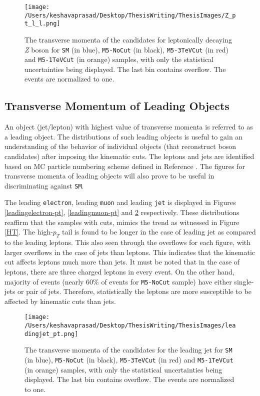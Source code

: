 \begin{figure}[!htb]
	\centering
	\texttt{[image: /Users/keshavaprasad/Desktop/ThesisWriting/ThesisImages/Z\_pt\_l\_l.png]}
	\caption{The transverse momenta of the candidates for leptonically decaying \textit{Z} boson for \texttt{SM} (in blue), \texttt{M5-NoCut} (in black), \texttt{M5-3TeVCut} (in red) and \texttt{M5-1TeVCut} (in orange) samples, with only the statistical uncertainties being displayed. The last bin contains overflow. The events are normalized to one.}
	\label{ZlepleppT}
\end{figure}

\subsection{Transverse Momentum of Leading Objects}
An object (jet/lepton) with highest value of transverse momenta is referred to as a leading object. The distributions of such leading objects is useful to gain an understanding of the behavior of individual objects (that reconstruct boson candidates) after imposing the kinematic cuts. The leptons and jets are identified based on MC particle numbering scheme defined in Reference \cite{PDG-ID-Code}. The figures for transverse momenta of leading objects will also prove to be useful in discriminating against \texttt{SM}. 

The leading \texttt{electron}, leading \texttt{muon} and leading \texttt{jet} is displayed in Figures \ref{leadingelectron-pt}, \ref{leadingmuon-pt} and \ref{leadingjet-pT} respectively. These distributions reaffirm that the samples with cuts, mimics the trend as witnessed in Figure \ref{HT}. The high-$p_{T}$ tail is found to be longer in the case of leading jet as compared to the leading leptons. This also seen through the overflows for each figure, with larger overflows in the case of jets than leptons. This indicates that the kinematic cut affects leptons much more than jets. It must be noted that in the case of leptons, there are three charged leptons in every event. On the other hand, majority of events (nearly 60\% of events for \texttt{M5-NoCut} sample) have either single-jets or pair of jets. Therefore, statistically the leptons are more susceptible to be affected by kinematic cuts than jets. 
\begin{figure}[!htb]
	\centering
	\texttt{[image: /Users/keshavaprasad/Desktop/ThesisWriting/ThesisImages/leadingjet\_pt.png]}
	\caption{The transverse momenta of the candidates for the leading jet for \texttt{SM} (in blue), \texttt{M5-NoCut} (in black), \texttt{M5-3TeVCut} (in red) and \texttt{M5-1TeVCut} (in orange) samples, with only the statistical uncertainties being displayed. The last bin contains overflow. The events are normalized to one.}
	\label{leadingjet-pT}
\end{figure}

